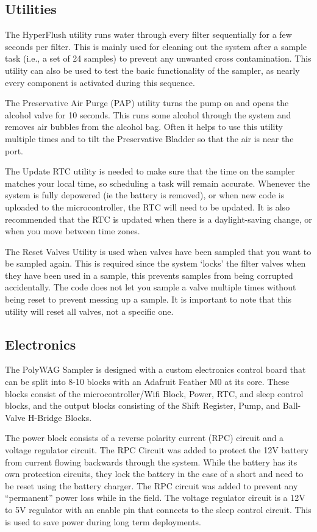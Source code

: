 \documentclass[11pt, letterpaper]{article}
\begin{document}
\subsection{Utilities}
The HyperFlush utility runs water through every filter sequentially for a few seconds per filter. This is mainly used for cleaning out the system after a sample task (i.e., a set of 24 samples) to prevent any unwanted cross contamination. This utility can also be used to test the basic functionality of the sampler, as nearly every component is activated during this sequence. 

The Preservative Air Purge (PAP) utility turns the pump on and opens the alcohol valve for 10 seconds. This runs some alcohol through the system and removes air bubbles from the alcohol bag. Often it helps to use this utility multiple times and to tilt the Preservative Bladder so that the air is near the port.

The Update RTC utility is needed to make sure that the time on the sampler matches your local time, so scheduling a task will remain accurate. Whenever the system is fully depowered (ie the battery is removed), or when new code is uploaded to the microcontroller, the RTC will need to be updated. It is also recommended that the RTC is updated when there is a daylight-saving change, or when you move between time zones.

The Reset Valves Utility is used when valves have been sampled that you want to be sampled again. This is required since the system ‘locks’ the filter valves when they have been used in a sample, this prevents samples from being corrupted accidentally. The code does not let you sample a valve multiple times without being reset to prevent messing up a sample. It is important to note that this utility will reset all valves, not a specific one.

\subsection{Electronics}

The PolyWAG Sampler is designed with a custom electronics control board that can be split into 8-10 blocks with an Adafruit Feather M0 at its core. These blocks consist of the microcontroller/Wifi Block, Power, RTC, and sleep control blocks, and the output blocks consisting of the Shift Register, Pump, and Ball-Valve H-Bridge Blocks. 


The power block consists of a reverse polarity current (RPC) circuit and a voltage regulator circuit. The RPC Circuit was added to protect the 12V battery from current flowing backwards through the system. While the battery has its own protection circuits, they lock the battery in the case of a short and need to be reset using the battery charger. The RPC circuit was added to prevent any “permanent” power loss while in the field. The voltage regulator circuit is a 12V to 5V regulator with an enable pin that connects to the sleep control circuit. This is used to save power during long term deployments. 
\end{document}
